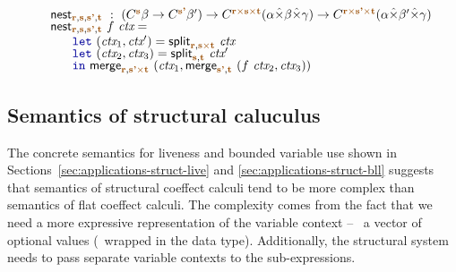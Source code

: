 \begin{figure*}[!t]
\begin{equation*}
\begin{array}{l}
 \\[0.4em]
\ident{nest}_{\aclrd{\textbf{r}}, \aclrd{\textbf{s}}, \aclrd{\textbf{s'}}, \aclrd{\textbf{t}}} ~:~
  (\ctyp{\aclrd{\textbf{s}}}{\beta} \rightarrow \ctyp{\aclrd{\textbf{s'}}}{\beta'}) \rightarrow
    \ctyp{\aclrd{\textbf{r}} \atimes \aclrd{\textbf{s}} \atimes \aclrd{\textbf{t}}}{(\alpha \xtimes \beta \xtimes \gamma)} \rightarrow
    \ctyp{\aclrd{\textbf{r}} \atimes \aclrd{\textbf{s'}} \atimes \aclrd{\textbf{t}}}{(\alpha \xtimes \beta' \xtimes \gamma)}\\[-0.25em]
\ident{nest}_{\aclrd{\textbf{r}}, \aclrd{\textbf{s}}, \aclrd{\textbf{s'}}, \aclrd{\textbf{t}}}~f~\ctx =\\
  \hspace{1.75em} \kvd{let}~(\ctx_1, \ctx') = \ident{split}_{\aclrd{\textbf{r}}, \aclrd{\textbf{s}}\atimes\aclrd{\textbf{t}}}~\ctx \\[-0.25em]
  \hspace{1.75em} \kvd{let}~(\ctx_2, \ctx_3) = \ident{split}_{\aclrd{\textbf{s}}, \aclrd{\textbf{t}}}~\ctx' \\[-0.25em] 
  \hspace{1.75em} \kvd{in}~\ident{merge}_{\aclrd{\textbf{r}}, \aclrd{\textbf{s'}}\atimes\aclrd{\textbf{t}}}~
        (\ctx_1, \ident{merge}_{\aclrd{\textbf{s'}}, \aclrd{\textbf{t}}}~(f~\ctx_2, \ctx_3))
\end{array}
\end{equation*}
\label{fig:struct-semantics}
\vspace{-0.5em}
\end{figure*}

\subsection{Semantics of structural caluculus}

The concrete semantics for liveness and bounded variable use shown in 
Sections~\ref{sec:applications-struct-live} and \ref{sec:applications-struct-bll}
suggests that semantics of structural coeffect calculi tend to be more complex 
than semantics of flat coeffect calculi. The complexity comes from the fact
that we need a more expressive representation of the variable context -- \eg~a vector
of optional values (\ie~wrapped in the  data type). Additionally,
the structural system needs to pass separate variable contexts to the sub-expressions.

